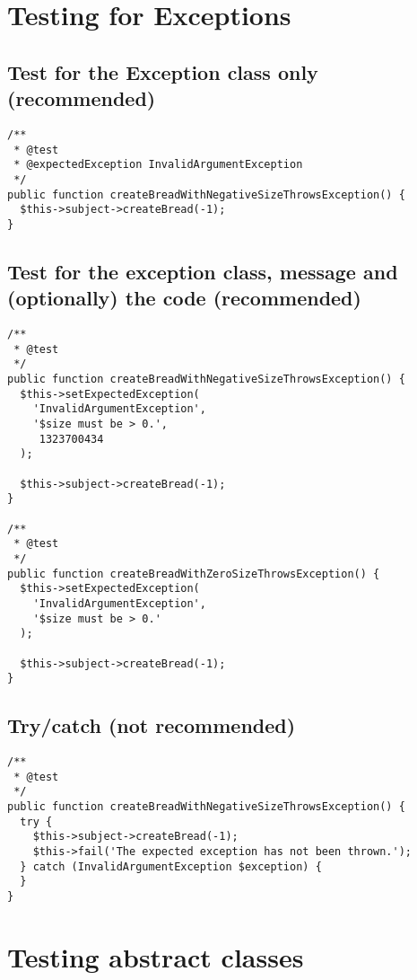 \documentclass[a4paper,twoside,landscape]{scrartcl}
\begin{document}
\section{Testing for Exceptions}

\subsection{Test for the Exception class only (recommended)}
\small
\begin{verbatim}
/**
 * @test
 * @expectedException InvalidArgumentException
 */
public function createBreadWithNegativeSizeThrowsException() {
  $this->subject->createBread(-1);
}
\end{verbatim}
\normalsize

\subsection{Test for the exception class, message and (optionally) the code (recommended)}
\small
\begin{verbatim}
/**
 * @test
 */
public function createBreadWithNegativeSizeThrowsException() {
  $this->setExpectedException(
    'InvalidArgumentException',
    '$size must be > 0.',
     1323700434
  );

  $this->subject->createBread(-1);
}

/**
 * @test
 */
public function createBreadWithZeroSizeThrowsException() {
  $this->setExpectedException(
    'InvalidArgumentException',
    '$size must be > 0.'
  );

  $this->subject->createBread(-1);
}
\end{verbatim}
\normalsize

\subsection{Try/catch (not recommended)}
\small
\begin{verbatim}
/**
 * @test
 */
public function createBreadWithNegativeSizeThrowsException() {
  try {
    $this->subject->createBread(-1);
    $this->fail('The expected exception has not been thrown.');
  } catch (InvalidArgumentException $exception) {
  }
}
\end{verbatim}
\normalsize

\newpage

\section{Testing abstract classes}
\end{document}
